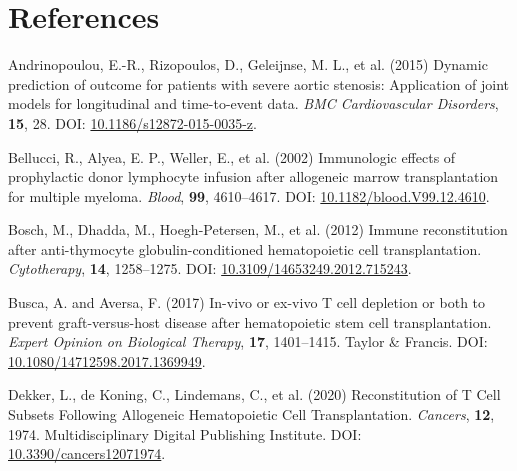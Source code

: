 \documentclass[
  letterpaper,
  DIV=11,
  numbers=noendperiod]{scrreprt}
\newlength{\cslhangindent}
\newlength{\cslentryspacingunit} %
\newenvironment{CSLReferences}[2] %
 {%
  \setlength{\parindent}{0pt}
  \ifodd #1
  \let\oldpar\par
  \def\par{\hangindent=\cslhangindent\oldpar}
  \fi
  \setlength{\parskip}{#2\cslentryspacingunit}
 }%
 {}
\begin{document}
\hypertarget{references-4}{%
\section*{References}\label{references-4}}


\hypertarget{refs-6}{}
\begin{CSLReferences}{1}{0}
\leavevmode{}%
Andrinopoulou, E.-R., Rizopoulos, D., Geleijnse, M. L., et al. (2015)
Dynamic prediction of outcome for patients with severe aortic stenosis:
Application of joint models for longitudinal and time-to-event data.
\emph{BMC Cardiovascular Disorders}, \textbf{15}, 28. DOI:
\href{https://doi.org/10.1186/s12872-015-0035-z}{10.1186/s12872-015-0035-z}.

\leavevmode{}%
Bellucci, R., Alyea, E. P., Weller, E., et al. (2002) Immunologic
effects of prophylactic donor lymphocyte infusion after allogeneic
marrow transplantation for multiple myeloma. \emph{Blood}, \textbf{99},
4610--4617. DOI:
\href{https://doi.org/10.1182/blood.V99.12.4610}{10.1182/blood.V99.12.4610}.

\leavevmode{}%
Bosch, M., Dhadda, M., Hoegh-Petersen, M., et al. (2012) Immune
reconstitution after anti-thymocyte globulin-conditioned hematopoietic
cell transplantation. \emph{Cytotherapy}, \textbf{14}, 1258--1275. DOI:
\href{https://doi.org/10.3109/14653249.2012.715243}{10.3109/14653249.2012.715243}.

\leavevmode{}%
Busca, A. and Aversa, F. (2017) In-vivo or ex-vivo {T} cell depletion or
both to prevent graft-versus-host disease after hematopoietic stem cell
transplantation. \emph{Expert Opinion on Biological Therapy},
\textbf{17}, 1401--1415. Taylor \& Francis. DOI:
\href{https://doi.org/10.1080/14712598.2017.1369949}{10.1080/14712598.2017.1369949}.

\leavevmode{}%
Dekker, L., de Koning, C., Lindemans, C., et al. (2020) Reconstitution
of {T Cell Subsets Following Allogeneic Hematopoietic Cell
Transplantation}. \emph{Cancers}, \textbf{12}, 1974. Multidisciplinary
Digital Publishing Institute. DOI:
\href{https://doi.org/10.3390/cancers12071974}{10.3390/cancers12071974}.


\end{CSLReferences}
\end{document}
